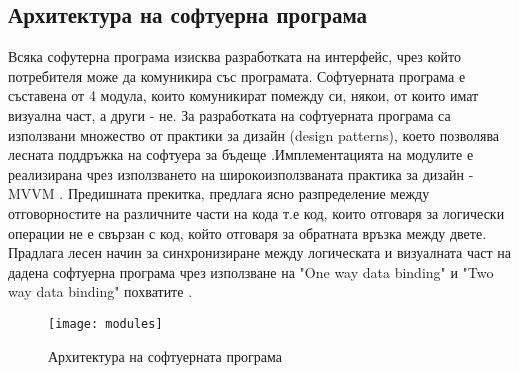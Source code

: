 \subsection{Архитектура на софтуерна програма}
Всяка софутерна програма изисква разработката на интерфейс, чрез който потребителя може да комуникира със програмата. Софтуерната програма е съставена от 4 модула, които комуникират помежду си, някои, от които имат визуална част, а други - не.
За разработката на софтуерната програма са използвани множество от практики за дизайн (design patterns), което позволява лесната поддръжка на софтуера за бъдеще \cite{patterns}.Имплементацията на модулите е реализирана чрез използването на широкоизползваната практика за дизайн - MVVM \cite{mvvm}. Предишната прекитка, предлага ясно разпределение между отговорностите на различните части на кода т.е код, които отговаря за логически операции не е свързан с код, който отговаря за обратната връзка между двете. Прадлага лесен начин за синхронизиране между логическата и визуалната част на дадена софтуерна програма чрез използване на "One way data binding" и "Two way data binding" похватите \cite{dataBinding}.

\begin{figure}
    \centerline{\texttt{[image: modules]}}
    \caption{Архитектура на софтуерната програма}
    \label{fig:architecture}
\end{figure}


